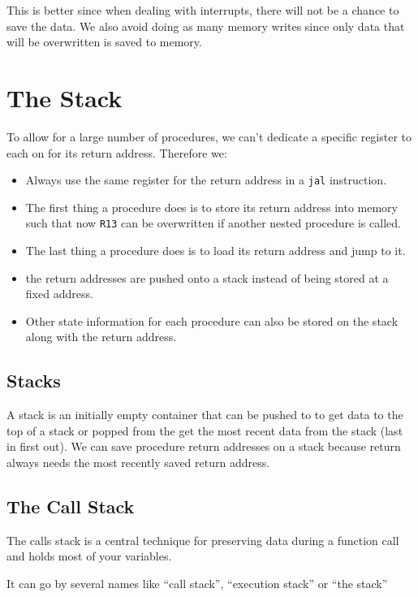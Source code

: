 This is better since when dealing with interrupts, there will not be a chance to save the data.
We also avoid doing as many memory writes since only data that will be overwritten is saved to memory.

\section{The Stack}\label{sec:the_stack}

To allow for a large number of procedures, we can't dedicate a specific register to each on for its return address.
Therefore we:
\begin{itemize}
	\item Always use the same register for the return address in a \texttt{jal} instruction.
	\item The first thing a procedure does is to store its return address into memory such that now \texttt{R13} can be overwritten if another nested procedure is called.
	\item The last thing a procedure does is to load its return address and jump to it.
	\item the return addresses are pushed onto a stack instead of being stored at a fixed address.
	\item Other state information for each procedure can also be stored on the stack along with the return address.
\end{itemize}

\subsection{Stacks}\label{sub:stacks}

A stack is an initially empty container that can be pushed to to get data to the top of a stack or popped from the get the most recent data from the stack (last in first out).
We can save procedure return addresses on a stack because return always needs the most recently saved return address.

\subsection{The Call Stack}\label{sub:the_call_stack}

The calls stack is a central technique for preserving data during a function call and holds most of your variables.

It can go by several names like ``call stack'', ``execution stack'' or ``the stack''

